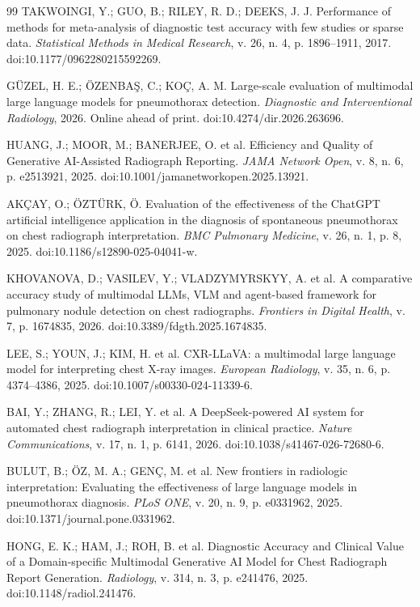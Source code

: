 \documentclass[12pt,a4paper]{article}
\begin{document}
\begin{singlespace}
\begin{thebibliography}{99}
 TAKWOINGI, Y.; GUO, B.; RILEY, R. D.; DEEKS, J. J. Performance of methods for meta-analysis of diagnostic test accuracy with few studies or sparse data. \textit{Statistical Methods in Medical Research}, v. 26, n. 4, p. 1896--1911, 2017. doi:10.1177/0962280215592269.

 GÜZEL, H. E.; ÖZENBA\c{S}, C.; KOÇ, A. M. Large-scale evaluation of multimodal large language models for pneumothorax detection. \textit{Diagnostic and Interventional Radiology}, 2026. Online ahead of print. doi:10.4274/dir.2026.263696.

 HUANG, J.; MOOR, M.; BANERJEE, O. et al. Efficiency and Quality of Generative AI-Assisted Radiograph Reporting. \textit{JAMA Network Open}, v. 8, n. 6, p. e2513921, 2025. doi:10.1001/jamanetworkopen.2025.13921.

 AKÇAY, O.; ÖZTÜRK, Ö. Evaluation of the effectiveness of the ChatGPT artificial intelligence application in the diagnosis of spontaneous pneumothorax on chest radiograph interpretation. \textit{BMC Pulmonary Medicine}, v. 26, n. 1, p. 8, 2025. doi:10.1186/s12890-025-04041-w.

 KHOVANOVA, D.; VASILEV, Y.; VLADZYMYRSKYY, A. et al. A comparative accuracy study of multimodal LLMs, VLM and agent-based framework for pulmonary nodule detection on chest radiographs. \textit{Frontiers in Digital Health}, v. 7, p. 1674835, 2026. doi:10.3389/fdgth.2025.1674835.

 LEE, S.; YOUN, J.; KIM, H. et al. CXR-LLaVA: a multimodal large language model for interpreting chest X-ray images. \textit{European Radiology}, v. 35, n. 6, p. 4374--4386, 2025. doi:10.1007/s00330-024-11339-6.

 BAI, Y.; ZHANG, R.; LEI, Y. et al. A DeepSeek-powered AI system for automated chest radiograph interpretation in clinical practice. \textit{Nature Communications}, v. 17, n. 1, p. 6141, 2026. doi:10.1038/s41467-026-72680-6.

 BULUT, B.; ÖZ, M. A.; GENÇ, M. et al. New frontiers in radiologic interpretation: Evaluating the effectiveness of large language models in pneumothorax diagnosis. \textit{PLoS ONE}, v. 20, n. 9, p. e0331962, 2025. doi:10.1371/journal.pone.0331962.

 HONG, E. K.; HAM, J.; ROH, B. et al. Diagnostic Accuracy and Clinical Value of a Domain-specific Multimodal Generative AI Model for Chest Radiograph Report Generation. \textit{Radiology}, v. 314, n. 3, p. e241476, 2025. doi:10.1148/radiol.241476.


\end{thebibliography}
\end{singlespace}
\end{document}
